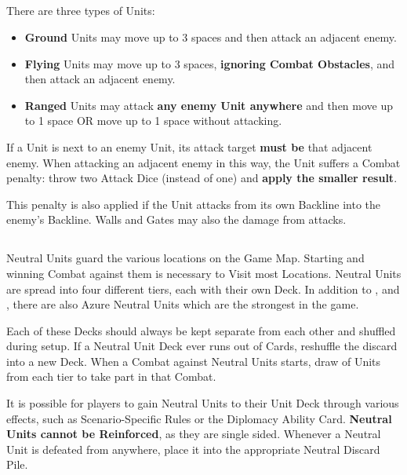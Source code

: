 \begin{multicols}{2}
\vspace*{\fill}

\columnbreak

\subsection*{}
There are three types of Units:
\begin{itemize}
  \item \textbf{Ground}  Units may move up to 3 spaces and then attack an adjacent enemy.
  \item \textbf{Flying}  Units may move up to 3 spaces, \textbf{ignoring Combat Obstacles}, and then attack an adjacent enemy.
  \item \textbf{Ranged}  Units may attack \textbf{any enemy Unit anywhere} and then move up to 1 space OR move up to 1 space without attacking.
\end{itemize}
If a  Unit is next to an enemy Unit, its attack target \textbf{must be} that adjacent enemy.
When attacking an adjacent enemy in this way, the  Unit suffers a Combat penalty: throw two Attack Dice (instead of one) and \textbf{apply the smaller result}.\par
This penalty is also applied if the  Unit attacks from its own Backline into the enemy's Backline.
Walls and Gates may also  the damage from   attacks.

\subsection*{}
Neutral Units guard the various locations on the Game Map.
Starting and winning Combat against them is necessary to Visit most Locations.
Neutral Units are spread into four different tiers, each with their own Deck.
In addition to ,  and , there are also Azure  Neutral Units which are the strongest in the game.\par
Each of these Decks should always be kept separate from each other and shuffled during setup.
If a Neutral Unit Deck ever runs out of Cards, reshuffle the discard into a new Deck.
When a Combat against Neutral Units starts, draw  of Units from each tier to take part in that Combat.\par
It is possible for players to gain Neutral Units to their Unit Deck through various effects, such as Scenario-Specific Rules or the Diplomacy Ability Card.
\textbf{Neutral Units cannot be Reinforced}, as they are single sided.
Whenever a Neutral Unit is defeated from anywhere, place it into the appropriate Neutral Discard Pile.\par


\end{multicols}
